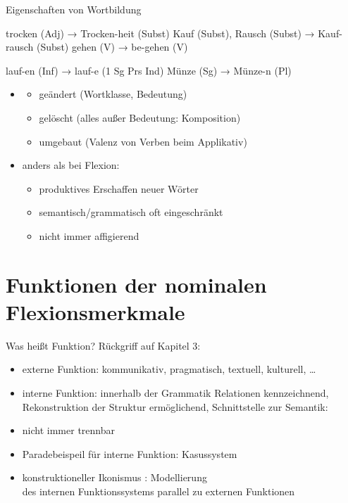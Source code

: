 \begin{frame}
  {Eigenschaften von Wortbildung}
  \pause
  \begin{exe}
    \ex
    \begin{xlist}
      \ex trocken (Adj) → \alert{Trocken-heit} (Subst)
      \ex Kauf (Subst), Rausch (Subst) → \alert{Kauf-rausch} (Subst)
      \ex gehen (V) → \alert{be-gehen} (V)
    \end{xlist}
    \pause
    \ex
    \begin{xlist}
      \ex lauf-en (Inf) → \alert{lauf-e} (1 Sg Prs Ind)
      \ex Münze (Sg) → \alert{Münze-n} (Pl)
    \end{xlist}
  \end{exe}
  \pause
  \Halbzeile
  \begin{itemize}[<+->]
    \item {}
      \begin{itemize}[<+->]
        \item geändert (Wortklasse, Bedeutung)
        \item gelöscht (alles außer Bedeutung: Komposition)
        \item umgebaut (Valenz von Verben beim Applikativ)
      \end{itemize}
  \Halbzeile
    \item anders als bei Flexion:
      \begin{itemize}
        \item \alert{produktives Erschaffen neuer Wörter}
        \item semantisch\slash grammatisch oft eingeschränkt
        \item nicht immer affigierend
      \end{itemize}
  \end{itemize}
\end{frame}

\section{Funktionen der nominalen Flexionsmerkmale}

\begin{frame}
  {Was heißt Funktion?}
  \pause
  Rückgriff auf Kapitel 3:
  \pause
  \Halbzeile
  \begin{itemize}[<+->]
    \item \alert{externe} Funktion: kommunikativ, pragmatisch, textuell, kulturell, \dots
    \item \alert{interne} Funktion: innerhalb der Grammatik Relationen kennzeichnend,
      Rekonstruktion der Struktur ermöglichend, Schnittstelle zur Semantik: 
    \item nicht immer trennbar
      \Halbzeile
    \item Paradebeispeil für interne Funktion: \alert{Kasussystem}
      \Halbzeile
    \item konstruktioneller Ikonismus \citep{Eisenberg2013a}: Modellierung\\
      des internen Funktionssystems parallel zu externen Funktionen
  \end{itemize}
\end{frame}

